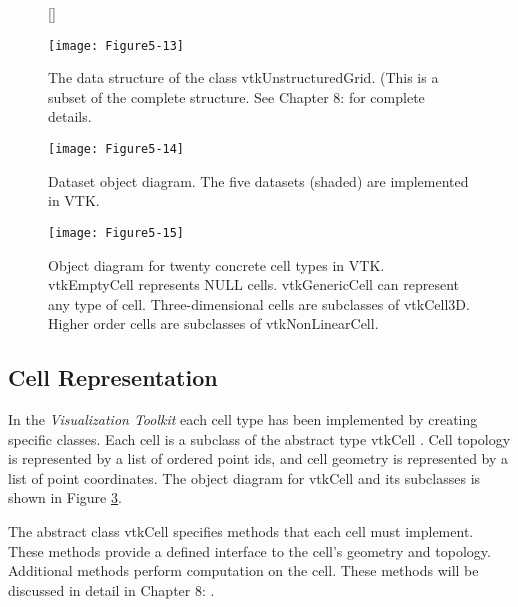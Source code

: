 \begin{figure}[!htb]
	[\FBwidth]
	{\caption{The data structure of the class vtkUnstructuredGrid. (This is a subset of the complete structure. See Chapter 8:  for complete details.}\label{fig:Figure5-13}}
	{\texttt{[image: Figure5-13]}}
\end{figure}



\begin{figure}[!htb]
	\centering
	\texttt{[image: Figure5-14]}
	\caption{Dataset object diagram. The five datasets (shaded) are implemented in VTK.}
	\label{fig:Figure5-14}
\end{figure}

\begin{figure}[!htb]
	\centering
	\texttt{[image: Figure5-15]}
	\caption{Object diagram for twenty concrete cell types in VTK. vtkEmptyCell represents NULL cells. vtkGenericCell can represent any type of cell. Three-dimensional cells are subclasses of vtkCell3D. Higher order cells are subclasses of vtkNonLinearCell.}
	\label{fig:Figure5-15}
\end{figure}


\subsection{Cell Representation}

In the \emph{Visualization Toolkit} each cell type has been implemented by creating specific classes. Each cell is a subclass of the abstract type vtkCell . Cell topology is represented by a list of ordered point ids, and cell geometry is represented by a list of point coordinates. The object diagram for vtkCell and its subclasses is shown in Figure \ref{fig:Figure5-15}.

The abstract class vtkCell specifies methods that each cell must implement. These methods provide a defined interface to the cell's geometry and topology. Additional methods perform computation on the cell. These methods will be discussed in detail in Chapter 8: .

